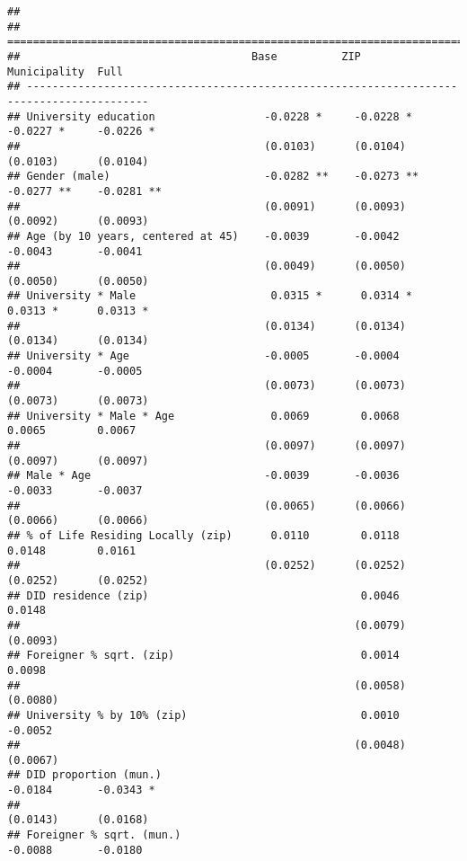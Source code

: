 \documentclass[
]{article}
\begin{document}
\begin{verbatim}
## 
## =========================================================================================
##                                    Base          ZIP           Municipality  Full        
## -----------------------------------------------------------------------------------------
## University education                 -0.0228 *     -0.0228 *     -0.0227 *     -0.0226 * 
##                                      (0.0103)      (0.0104)      (0.0103)      (0.0104)  
## Gender (male)                        -0.0282 **    -0.0273 **    -0.0277 **    -0.0281 **
##                                      (0.0091)      (0.0093)      (0.0092)      (0.0093)  
## Age (by 10 years, centered at 45)    -0.0039       -0.0042       -0.0043       -0.0041   
##                                      (0.0049)      (0.0050)      (0.0050)      (0.0050)  
## University * Male                     0.0315 *      0.0314 *      0.0313 *      0.0313 * 
##                                      (0.0134)      (0.0134)      (0.0134)      (0.0134)  
## University * Age                     -0.0005       -0.0004       -0.0004       -0.0005   
##                                      (0.0073)      (0.0073)      (0.0073)      (0.0073)  
## University * Male * Age               0.0069        0.0068        0.0065        0.0067   
##                                      (0.0097)      (0.0097)      (0.0097)      (0.0097)  
## Male * Age                           -0.0039       -0.0036       -0.0033       -0.0037   
##                                      (0.0065)      (0.0066)      (0.0066)      (0.0066)  
## % of Life Residing Locally (zip)      0.0110        0.0118        0.0148        0.0161   
##                                      (0.0252)      (0.0252)      (0.0252)      (0.0252)  
## DID residence (zip)                                 0.0046                      0.0148   
##                                                    (0.0079)                    (0.0093)  
## Foreigner % sqrt. (zip)                             0.0014                      0.0098   
##                                                    (0.0058)                    (0.0080)  
## University % by 10% (zip)                           0.0010                     -0.0052   
##                                                    (0.0048)                    (0.0067)  
## DID proportion (mun.)                                            -0.0184       -0.0343 * 
##                                                                  (0.0143)      (0.0168)  
## Foreigner % sqrt. (mun.)                                         -0.0088       -0.0180   

\end{verbatim}
\end{document}
